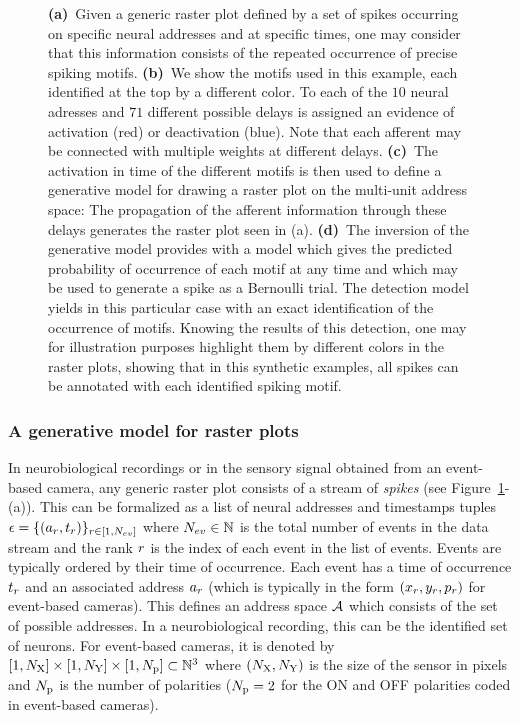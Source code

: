 \documentclass[default]{sn-jnl}%
\theoremstyle{thmstyleone}%
\theoremstyle{thmstyletwo}%
\theoremstyle{thmstylethree}%
\begin{document}
\begin{figure}
{	    {\bf (a)}~Given a generic raster plot defined by a set of spikes occurring on specific neural addresses and at specific times, one may consider that this information consists of the repeated occurrence of precise spiking motifs. 
	    {\bf (b)}~We show the motifs used in this example, each identified at the top by a different color. To each of the $10$ neural adresses and $71$ different possible delays is assigned an evidence of activation (red) or deactivation (blue). Note that each afferent may be connected with multiple weights at different delays.
	    {\bf (c)}~The activation in time of the different motifs is then used to define a generative model for drawing a raster plot on the multi-unit address space: The propagation of the afferent information through these delays generates the raster plot seen in (a). 
	    {\bf (d)}~The inversion of the generative model provides with a model which gives the predicted probability of occurrence of each motif at any time and which may be used to generate a spike as a Bernoulli trial. The detection model yields in this particular case with an exact identification of the occurrence of motifs. Knowing the results of this detection, one may for illustration purposes highlight them by different colors in the raster plots, showing that in this synthetic examples, all spikes can be annotated with each identified spiking motif. 
	    }
    \label{fig:model}
\end{figure}
% 
\subsubsection{A generative model for raster plots}
%
In neurobiological recordings or in the sensory signal obtained from an event-based camera, any generic raster plot consists of a stream of \emph{spikes} (see Figure~\ref{fig:model}-(a)). This can be formalized as a list of neural addresses and timestamps tuples $\epsilon = \{(a_r, t_r)\}_{r \in [1,N_{ev}]}$ where $N_{ev} \in \mathbb{N} $ is the total number of events in the data stream and the rank $r$ is the index of each event in the list of events. Events are typically ordered by their time of occurrence. Each event has a time of occurrence $t_r$  and an associated address $a_r$ (which is typically in the form $(x_r, y_r, p_r)$ for event-based cameras). This defines an address space $\mathcal{A}$ which consists of the set of possible addresses. In a neurobiological recording, this can be the identified set of neurons. For event-based cameras, it is denoted by $[1, N_\text{X}]\times[1, N_\text{Y}] \times [1, N_\text{p}] \subset \mathbb{N}^3$ where $(N_\text{X}, N_\text{Y})$ is the size of the sensor in pixels and $N_\text{p}$ is the number of polarities ($N_\text{p}=2$ for the ON and OFF polarities coded in event-based cameras). 
\end{document}
